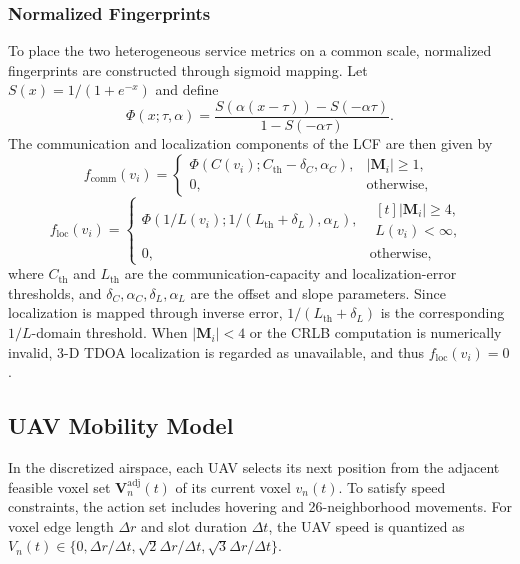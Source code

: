 \documentclass[10pt,journal,letterpaper]{IEEEtran}
\begin{document}
\subsubsection{Normalized Fingerprints}
To place the two heterogeneous service metrics on a common scale, normalized fingerprints are constructed through sigmoid mapping. Let $S(x)=1/(1+e^{-x})$ and define
\begin{equation}
\Phi(x;\tau,\alpha)=\frac{S(\alpha(x-\tau))-S(-\alpha\tau)}{1-S(-\alpha\tau)}.
\end{equation}
The communication and localization components of the LCF are then given by
\begin{equation}
f_{\mathrm{comm}}(v_i)=
\begin{cases}
\Phi(C(v_i);C_{\mathrm{th}}-\delta_C,\alpha_C), & |\mathbf{M}_i|\ge 1,\\
0, & \mathrm{otherwise},
\end{cases}
\end{equation}
\begin{equation}
f_{\mathrm{loc}}(v_i)=
\begin{cases}
\Phi(1/L(v_i);1/(L_{\mathrm{th}}+\delta_L),\alpha_L), & \begin{aligned}[t]|\mathbf{M}_i|\ge 4,\\ L(v_i)<\infty,\end{aligned}\\
0, & \mathrm{otherwise},
\end{cases}
\end{equation}
where $C_{\mathrm{th}}$ and $L_{\mathrm{th}}$ are the communication-capacity and localization-error thresholds, and $\delta_C,\alpha_C,\delta_L,\alpha_L$ are the offset and slope parameters. Since localization is mapped through inverse error, $1/(L_{\mathrm{th}}+\delta_L)$ is the corresponding $1/L$-domain threshold. When $|\mathbf{M}_i|<4$ or the CRLB computation is numerically invalid, 3-D TDOA localization is regarded as unavailable, and thus $f_{\mathrm{loc}}(v_i)=0$.

\subsection{UAV Mobility Model}

In the discretized airspace, each UAV selects its next position from the adjacent feasible voxel set $\mathbf{V}_n^{\mathrm{adj}}(t)$ of its current voxel $v_n(t)$. To satisfy speed constraints, the action set includes hovering and 26-neighborhood movements. For voxel edge length $\Delta r$ and slot duration $\Delta t$, the UAV speed is quantized as $V_n(t)\in\{0,\Delta r/\Delta t,\sqrt{2}\Delta r/\Delta t,\sqrt{3}\Delta r/\Delta t\}$.
\end{document}
